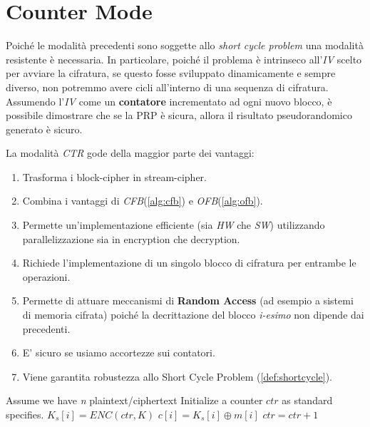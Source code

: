 \section{Counter Mode}
Poiché le modalità precedenti sono soggette allo \textit{short cycle problem} una modalità resistente è necessaria. In particolare, poiché il problema è intrinseco all'\textit{IV} scelto per avviare la cifratura, se questo fosse sviluppato dinamicamente e sempre diverso, non potremmo avere cicli all'interno di una sequenza di cifratura.\\
Assumendo l'\textit{IV} come un \textbf{contatore} incrementato ad ogni nuovo blocco, è possibile dimostrare che se la PRP è sicura, allora il risultato pseudorandomico generato è sicuro.
\begin{remark}
La modalità \textit{CTR} gode della maggior parte dei vantaggi:
\end{remark}
\begin{enumerate}
    \item [\textcolor{green}{\checkmark}]Trasforma i block-cipher in stream-cipher.
    \item [\textcolor{green}{\checkmark}]Combina i vantaggi di \textit{CFB}(\cref{alg:cfb}) e \textit{OFB}(\cref{alg:ofb}).
    \item [\textcolor{green}{\checkmark}]Permette un'implementazione efficiente (sia \textit{HW} che \textit{SW}) utilizzando parallelizzazione sia in encryption che decryption.
    \item [\textcolor{green}{\checkmark}]Richiede l'implementazione di un singolo blocco di cifratura per entrambe le operazioni.
    \item [\textcolor{green}{\checkmark}]Permette di attuare meccanismi di \textbf{Random Access} (ad esempio a sistemi di memoria cifrata) poiché la decrittazione del blocco \textit{i-esimo} non dipende dai precedenti.
    \item [\textcolor{green}{\checkmark}]E' sicuro se usiamo accortezze sui contatori.
    \item [\textcolor{green}{\checkmark}]Viene garantita robustezza allo Short Cycle Problem (\cref{def:shortcycle}).
\end{enumerate}
\begin{definition}\label{def:ctrmode}
\begin{algorithmic}[1]
\State Assume we have \textit{n} plaintext/ciphertext
\State Initialize a counter $ctr$ as standard specifies\footnotemark.
\State $K_s[i] = ENC(ctr,K)$
\State $c[i] = K_s[i]\oplus{m[i]}$
\State $ctr = ctr + 1$
\EndFor
\end{algorithmic}
\end{definition}
